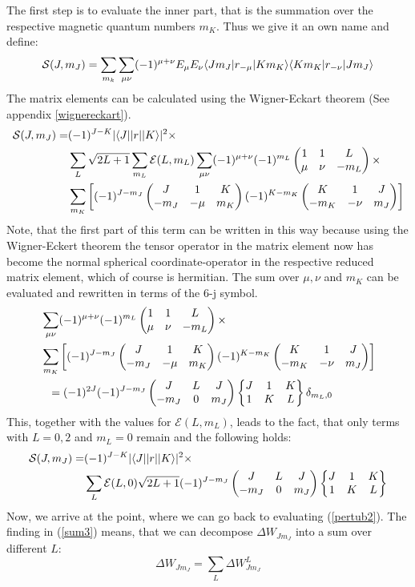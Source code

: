 The first step is to evaluate the inner part, that is the summation over the respective magnetic quantum numbers $m_K$. Thus we give it an own name and define:
\begin{equation}
\mathcal{S}(J,m_J)=\sum_{m_k}\sum_{\mu\nu}(-1)^{\mu+\nu}E_\mu E_\nu\langle Jm_J| r_{-\mu} | Km_K\rangle\langle Km_K| r_{-\nu} | Jm_J\rangle\label{sum}
\end{equation}
The matrix elements can be calculated using the Wigner-Eckart theorem (See appendix \ref{wignereckart}).
\begin{align}
\mathcal{S}(J,m_J)=&(-1)^{J-K}|\langle J| |r| | K\rangle|^2\times\notag\\&\sum_L\sqrt{2L+1}\sum_{m_L}\mathcal{E}(L,m_L)\sum_{\mu\nu}(-1)^{\mu+\nu}(-1)^{m_L}\begin{pmatrix}1&1&L\\\mu&\nu&-m_L\end{pmatrix}\times\notag\\&\sum_{m_K}\left[(-1)^{J-m_J}\begin{pmatrix}J&1&K\\-m_J&-\mu&m_K\end{pmatrix}(-1)^{K-m_K}\begin{pmatrix}K&1&J\\-m_K&-\nu&m_J\end{pmatrix}\right]\label{sum2}
\end{align}
Note, that the first part of this term can be written in this way because using the Wigner-Eckert theorem the tensor operator in the matrix element now has become the normal spherical coordinate-operator in the respective reduced matrix element, which of course is hermitian. The sum over $\mu,\nu$ and $m_K$ can be evaluated and rewritten in terms of the 6-j symbol.
\begin{align}
&\sum_{\mu\nu}(-1)^{\mu+\nu}(-1)^{m_L}\threej{1}{1}{L}{\mu}{\nu}{-m_L}\times\notag\\&\sum_{m_K}\left[(-1)^{J-m_J}\threej{J}{1}{K}{-m_J}{-\mu}{m_K}(-1)^{K-m_K}\threej{K}{1}{J}{-m_K}{-\nu}{m_J}\right]\notag\\&\ \ =(-1)^{2J}(-1)^{J-m_J}\threej{J}{L}{J}{-m_J}{0}{m_J}\sixj{J}{1}{K}{1}{K}{L}\delta_{m_L,0}
\end{align}
This, together with the values for $\mathcal{E}(L,m_L)$, leads to the fact, that only terms with $L=0,2$ and $m_L=0$ remain and the following holds:
\begin{align}
\mathcal{S}(J,m_J)=&(-1)^{J-K}|\langle J| |r| | K\rangle|^2\times\notag\\&\sum_{L}\mathcal{E}(L,0)\sqrt{2L+1} (-1)^{J-m_J}\begin{pmatrix}J&L&J\\-m_J&0&m_J\end{pmatrix}\begin{Bmatrix}J&1&K\\1&K&L\end{Bmatrix}\label{sum3}
\end{align}
Now, we arrive at the point, where we can go back to evaluating (\ref{pertub2}). The finding in (\ref{sum3}) means, that we can decompose $\Delta W_{Jm_J}$ into a sum over different $L$:
\begin{equation}
\Delta W_{Jm_J}=\sum_L\Delta W^L_{Jm_J}
\end{equation}
